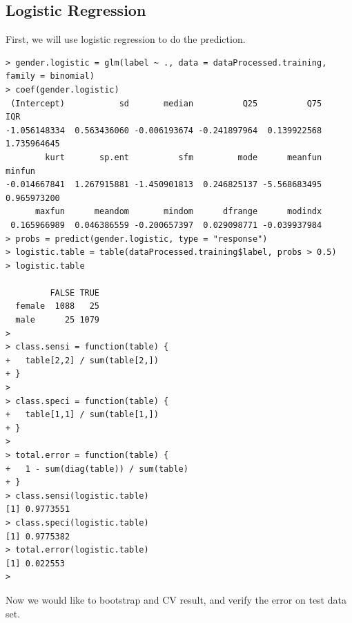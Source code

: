 \documentclass{article}%
\begin{document}
\subsection{Logistic Regression}
First, we will use logistic regression to do the prediction.
\begin{verbatim}> gender.logistic = glm(label ~ ., data = dataProcessed.training, family = binomial)
> coef(gender.logistic)
 (Intercept)           sd       median          Q25          Q75          IQR
-1.056148334  0.563436060 -0.006193674 -0.241897964  0.139922568  1.735964645
        kurt       sp.ent          sfm         mode      meanfun       minfun
-0.014667841  1.267915881 -1.450901813  0.246825137 -5.568683495  0.965973200
      maxfun      meandom       mindom      dfrange      modindx
 0.165966989  0.046386559 -0.200657397  0.029098771 -0.039937984
> probs = predict(gender.logistic, type = "response")
> logistic.table = table(dataProcessed.training$label, probs > 0.5)
> logistic.table

         FALSE TRUE
  female  1088   25
  male      25 1079
>
> class.sensi = function(table) {
+   table[2,2] / sum(table[2,])
+ }
>
> class.speci = function(table) {
+   table[1,1] / sum(table[1,])
+ }
>
> total.error = function(table) {
+   1 - sum(diag(table)) / sum(table)
+ }
> class.sensi(logistic.table)
[1] 0.9773551
> class.speci(logistic.table)
[1] 0.9775382
> total.error(logistic.table)
[1] 0.022553
> \end{verbatim}
Now we would like to bootstrap and CV result, and verify the error on test data set.
\end{document}
